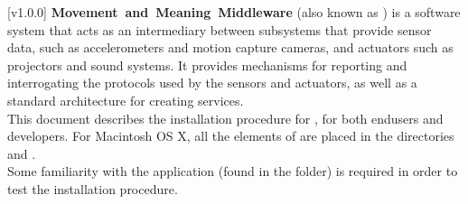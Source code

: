 [v1.0.0]
\textbf{Movement~and~Meaning~Middleware} (also known as \mplusm) is a software system
that acts as an intermediary between subsystems that provide sensor data, such as
accelerometers and motion capture cameras, and actuators such as projectors and sound
systems.
It provides mechanisms for reporting and interrogating the protocols used by the sensors
and actuators, as well as a standard architecture for creating services.\\

This document describes the installation procedure for \mplusm, for both
end\longDash{}users and developers.
For Macintosh OS X, all the elements of \mplusm{} are placed in the directories
 and .\\

Some familiarity with the  application (found in the
 folder) is required in order to test the installation
procedure.
\primaryEnd{}
